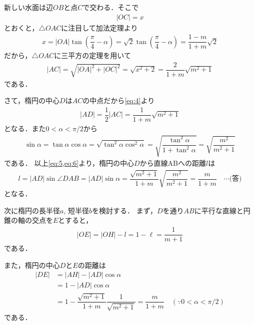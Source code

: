 \documentclass[../../main.tex]{subfiles}
\begin{document}
新しい水面は辺$OB$と点$C$で交わる．そこで
\begin{align}
  |OC| = x \label{eq:2}
\end{align}
とおくと，$\triangle OAC$に注目して加法定理より
\begin{align}
  x = |OA| \tan\left(\dfrac{\pi}{4}-\alpha\right)
  = \sqrt{2}\tan\left(\dfrac{\pi}{4}-\alpha\right) = \dfrac{1-m}{1+m}\sqrt{2} \label{eq:3}
\end{align}
だから，$\triangle OAC$に三平方の定理を用いて
\begin{align}
  |AC| = \sqrt{|OA|^2+|OC|^2} = \sqrt{x^2+2} = \dfrac{2}{1+m}\sqrt{m^2+1} \label{eq:4}
\end{align}
である．

さて，楕円の中心$D$は$AC$の中点だから\cref{eq:4}より
\begin{align}
  |AD| = \dfrac{1}{2}|AC| = \dfrac{1}{1+m}\sqrt{m^2+1} \label{eq:5}
\end{align}
となる．また$0<\alpha<\pi/2$から
\begin{align}
  \sin\alpha
  = \tan\alpha \cos\alpha
  = \sqrt{\tan^2\alpha \cos^2\alpha}
  = \sqrt{\dfrac{\tan^2\alpha}{1+\tan^2\alpha}}
  = \sqrt{\dfrac{m^2}{m^2+1}} \label{eq:6}
\end{align}
である．
以上\cref{eq:5,eq:6}より，楕円の中心$D$から直線ABへの距離$l$は
\begin{align}
  l = |AD| \sin\angle DAB = |AD|\sin\alpha = \dfrac{\sqrt{m^2+1}}{1+m}\sqrt{\dfrac{m^2}{m^2+1}} = \dfrac{m}{1+m} \quad\cdots\text{(答)} \label{eq:7}
\end{align}
となる．

次に楕円の長半径$a$, 短半径$b$を検討する．
まず，$D$を通り$AB$に平行な直線と円錐の軸の交点を$E$とすると，
\begin{align}
  |OE| = |OH| - l = 1-\ell = \dfrac{1}{m+1} \label{eq:8}
\end{align}
である．

また，楕円の中心$D$と$E$の距離は
\begin{align}
  |DE|
  &= |AH| - |AD|\cos\alpha \\
  &= 1-|AD|\cos\alpha \\
  &= 1-\dfrac{\sqrt{m^2+1}}{1+m}\dfrac{1}{\sqrt{m^2+1}} = \dfrac{m}{1+m} \quad (\because 0<\alpha<\pi/2) \label{eq:9}
\end{align}
である．
\end{document}
